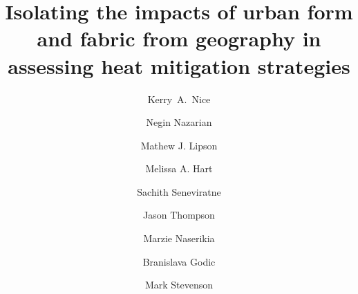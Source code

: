\documentclass[final,3p,times,authoryear]{elsarticle}
\begin{document}

\title{Isolating the impacts of urban form and fabric from geography in assessing heat mitigation strategies }

\author[melb]{Kerry~A.~Nice}
\author[arc,built,city]{Negin Nazarian}
\author[arc]{Mathew J. Lipson}
\author[arc]{Melissa A. Hart}
\author[melb]{Sachith Seneviratne}
\author[melb]{Jason Thompson}
\author[arc]{Marzie Naserikia}
\author[melb]{Branislava Godic}
\author[melb,eng]{Mark Stevenson}
\address[melb]{Transport, Health, and Urban Design Research Lab, Faculty of Architecture, Building, and Planning, University of Melbourne, Australia.}
\address[arc]{ARC Centre of Excellence for Climate Extremes, University of New South Wales, Sydney, NSW, Australia.}
\address[built]{School of Built Environment, University of New South Wales, Sydney, NSW, Australia.}
\address[city]{City Futures Research Centre, University of New South Wales, Sydney, NSW, Australia.}
\address[eng]{Melbourne School of Engineering; and Melbourne School of Population and Global Health, University of Melbourne, Australia.}
\end{document}
